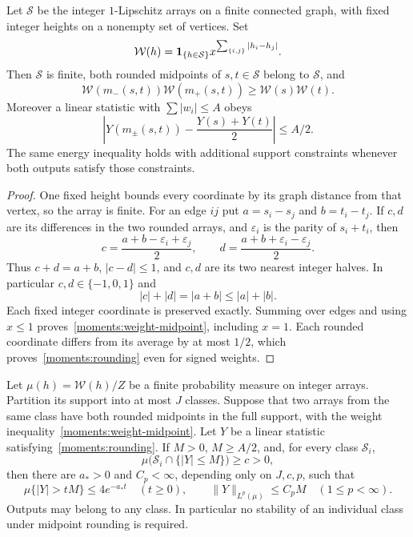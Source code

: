 \begin{lemma}
\label{moments:weighted-midpoints}
Let $\mathcal S$ be the integer $1$-Lipschitz arrays on a finite
connected graph, with fixed integer heights on a nonempty set of
vertices.  Set
\[
 \mathcal W(h)=\mathbf 1_{\{h\in\mathcal S\}}
       x^{\sum_{\{i,j\}}|h_i-h_j|}.
\]
Then $\mathcal S$ is finite, both rounded midpoints of $s,t\in\mathcal S$
belong to $\mathcal S$, and
\begin{equation}\label{moments:weight-midpoint}
 \mathcal W(m_-(s,t))\mathcal W(m_+(s,t))\geq \mathcal W(s)\mathcal W(t).
\end{equation}
Moreover a linear statistic with $\sum|w_i|\leq A$ obeys
\begin{equation}\label{moments:rounding}
 \left|Y(m_\pm(s,t))-\frac{Y(s)+Y(t)}2\right|\leq A/2.
\end{equation}
The same energy inequality holds with additional support constraints
whenever both outputs satisfy those constraints.
\end{lemma}

\begin{proof}
One fixed height bounds every coordinate by its graph distance from
that vertex, so the array is finite.  For an edge $ij$ put
$a=s_i-s_j$ and $b=t_i-t_j$.  If $c,d$ are its differences in the two
rounded arrays, and $\varepsilon_i$ is the parity of $s_i+t_i$, then
\[
 c=\frac{a+b-\varepsilon_i+\varepsilon_j}{2},\qquad
 d=\frac{a+b+\varepsilon_i-\varepsilon_j}{2}.
\]
Thus $c+d=a+b$, $|c-d|\leq1$, and $c,d$ are its two nearest integer
halves.  In particular $c,d\in\{-1,0,1\}$ and
\[
 |c|+|d|=|a+b|\leq|a|+|b|.
\]
Each fixed integer coordinate is preserved exactly.  Summing over edges
and using $x\leq1$ proves~\eqref{moments:weight-midpoint}, including
$x=1$.  Each rounded coordinate differs from its average by at most
$1/2$, which proves~\eqref{moments:rounding} even for signed weights.
\end{proof}

\begin{lemma}
\label{lem:midpoint-amplification}
Let $\mu(h)=\mathcal W(h)/Z$ be a finite probability measure on integer arrays.
Partition its support into at most $J$ classes.  Suppose that two arrays
from the same class have both rounded midpoints in the full support,
with the weight inequality~\eqref{moments:weight-midpoint}.  Let $Y$ be
a linear statistic satisfying~\eqref{moments:rounding}.  If $M>0$,
$M\geq A/2$, and, for every class $\mathcal S_i$,
\begin{equation}\label{moments:class-central}
 \mu\bigl(\mathcal S_i\cap\{|Y|\leq M\}\bigr)\geq c>0,
\end{equation}
then there are $a_*>0$ and $C_p<\infty$, depending only on $J,c,p$, such
that
\begin{equation}\label{moments:amplification}
 \mu\{|Y|>tM\}\leq4e^{-a_*t}\quad(t\geq0),
 \qquad \|Y\|_{L^p(\mu)}\leq C_pM\quad(1\leq p<\infty).
\end{equation}
Outputs may belong to any class.  In particular no stability of an
individual class under midpoint rounding is required.
\end{lemma}

